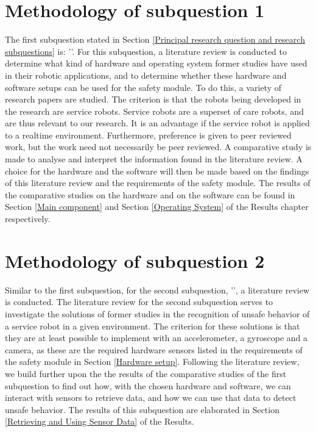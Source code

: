 \documentclass[12pt]{scrreprt}
\begin{document}
\section{Methodology of subquestion 1}
\label{Methodology of subquestion 1}
The first subquestion stated in Section \ref{Principal research question and research subquestions} is: '\sqone'. For this subquestion, a literature review is conducted to determine what kind of hardware and operating system former studies have used in their robotic applications, and to determine whether these hardware and software setups can be used for the safety module. To do this, a variety of research papers are studied. The criterion is that the robots being developed in the research are service robots. Service robots are a superset of care robots, and are thus relevant to our research. It is an advantage if the service robot is applied to a realtime environment. Furthermore, preference is given to peer reviewed work, but the work need not necessarily be peer reviewed. A comparative study is made to analyse and interpret the information found in the literature review. A choice for the hardware and the software will then be made based on the findings of this literature review and the requirements of the safety module. The results of the comparative studies on the hardware and on the software can be found in Section \ref{Main component} and Section \ref{Operating System} of the Results chapter respectively.


\section{Methodology of subquestion 2}
\label{Methodology of subquestion 2}
Similar to the first subquestion, for the second subquestion, '\sqtwo', a literature review is conducted. The literature review for the second subquestion serves to investigate the solutions of former studies in the recognition of unsafe behavior of a service robot in a given environment. The criterion for these solutions is that they are at least possible to implement with an accelerometer, a gyroscope and a camera, as these are the required hardware sensors listed in the requirements of the safety module in Section \ref{Hardware setup}. Following the literature review, we build further upon the the results of the comparative studies of the first subquestion to find out how, with the chosen hardware and software, we can interact with sensors to retrieve data, and how we can use that data to detect unsafe behavior. The results of this subquestion are elaborated in Section \ref{Retrieving and Using Sensor Data} of the Results.
\end{document}
